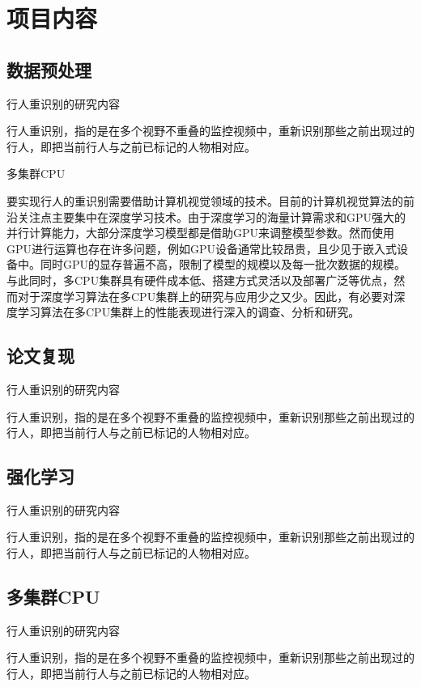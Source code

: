 \section{项目内容}

\subsection{数据预处理}

    \begin{frame}{行人重识别的研究内容}
    \begin{block}{}
    行人重识别，指的是在多个视野不重叠的监控视频中，重新识别那些之前出现过的行人，即把当前行人与之前已标记的人物相对应。
    \end{block}
    \end{frame}

    \begin{frame}{多集群CPU}
    \begin{block}{}
    要实现行人的重识别需要借助计算机视觉领域的技术。目前的计算机视觉算法的前沿关注点主要集中在深度学习技术。由于深度学习的海量计算需求和GPU强大的并行计算能力，大部分深度学习模型都是借助GPU来调整模型参数。然而使用GPU进行运算也存在许多问题，例如GPU设备通常比较昂贵，且少见于嵌入式设备中。同时GPU的显存普遍不高，限制了模型的规模以及每一批次数据的规模。与此同时，多CPU集群具有硬件成本低、搭建方式灵活以及部署广泛等优点，然而对于深度学习算法在多CPU集群上的研究与应用少之又少。因此，有必要对深度学习算法在多CPU集群上的性能表现进行深入的调查、分析和研究。
    \end{block}
    \end{frame}

\subsection{论文复现}

    \begin{frame}{行人重识别的研究内容}
    \begin{block}{}
    行人重识别，指的是在多个视野不重叠的监控视频中，重新识别那些之前出现过的行人，即把当前行人与之前已标记的人物相对应。
    \end{block}
    \end{frame}

\subsection{强化学习}

    \begin{frame}{行人重识别的研究内容}
    \begin{block}{}
    行人重识别，指的是在多个视野不重叠的监控视频中，重新识别那些之前出现过的行人，即把当前行人与之前已标记的人物相对应。
    \end{block}
    \end{frame}

\subsection{多集群CPU}

    \begin{frame}{行人重识别的研究内容}
    \begin{block}{}
    行人重识别，指的是在多个视野不重叠的监控视频中，重新识别那些之前出现过的行人，即把当前行人与之前已标记的人物相对应。
    \end{block}
    \end{frame}
